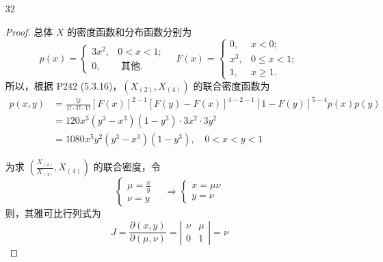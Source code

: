 \documentclass[normal,cn]{elegantnote}
\begin{document}
\begin{enumerate}
    \item[32]
        \begin{proof}
            总体 $X$ 的密度函数和分布函数分别为
            \begin{equation*}
                p(x)=\left\{\begin{array}{ll}
                    3x^{2}, & 0<x<1;        \\
                    0,      & \text{ 其他}.
                \end{array}\right.\quad
                F(x)=\left\{\begin{array}{ll}
                    0,     & x<0;       \\
                    x^{3}, & 0\leq x<1; \\
                    1,     & x\geq 1.
                \end{array}\right.
            \end{equation*}
            所以，根据 P242 (5.3.16)，$\left(X_{(2)},X_{(4)}\right)$ 的联合密度函数为
            \begin{equation*}
                \begin{aligned}
                    p\left(x,y\right) & =\frac{5!}{1! \cdot 1! \cdot 1!}\left[F\left(x\right)\right]^{2-1}\left[F\left(y\right)-F\left(x\right)\right]^{4-2-1}\left[1-F\left(y\right)\right]^{5-4}p\left(x\right)p\left(y\right) \\
                                      & =120x^{3}\left(y^{3}-x^{3}\right)\left(1-y^{3}\right) \cdot 3x^{2} \cdot 3y^{2}                                                                                                          \\
                                      & =1080x^{5}y^{2}\left(y^{3}-x^{3}\right)\left(1-y^{3}\right),\quad 0<x<y<1
                \end{aligned}
            \end{equation*}

            为求 $\left(\frac{X_{(2)}}{X_{(4)}},X_{(4)}\right)$ 的联合密度，令
            \begin{equation*}
                \left\{\begin{array}{ll}
                    \mu=\frac{x}{y} \\
                    \nu=y
                \end{array}\right.\quad\Longrightarrow
                \left\{\begin{array}{ll}
                    x=\mu\nu \\
                    y=\nu
                \end{array}\right.
            \end{equation*}
            则，其雅可比行列式为
            \begin{equation*}
                J=\frac{\partial\left(x,y\right)}{\partial\left(\mu,\nu\right)}=\left|\begin{array}{cc}
                    \nu & \mu \\
                    0   & 1
                \end{array}\right|=\nu
            \end{equation*}


\end{proof}
\end{enumerate}
\end{document}
